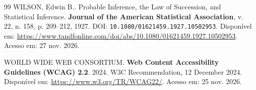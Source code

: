 \begin{thebibliography}{99}
WILSON, Edwin B.. Probable Inference, the Law of Succession, and Statistical Inference. \textbf{Journal of the American Statistical Association}, v. 22, n. 158, p. 209--212, 1927. DOI: \nolinkurl{10.1080/01621459.1927.10502953}. Disponível em: \url{https://www.tandfonline.com/doi/abs/10.1080/01621459.1927.10502953}. Acesso em: 27 nov. 2026.

WORLD WIDE WEB CONSORTIUM. \textbf{Web Content Accessibility Guidelines ({WCAG}) 2.2}. 2024. W3C Recommendation, 12 December 2024. Disponível em: \url{https://www.w3.org/TR/WCAG22/}. Acesso em: 25 nov. 2026.

\end{thebibliography}
\endgroup
